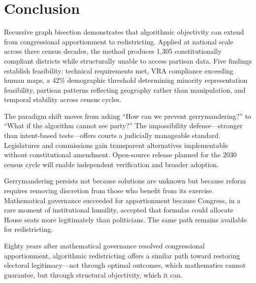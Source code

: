 \section{Conclusion}

Recursive graph bisection demonstrates that algorithmic objectivity can extend from congressional apportionment to redistricting. Applied at national scale across three census decades, the method produces 1,305 constitutionally compliant districts while structurally unable to access partisan data. Five findings establish feasibility: technical requirements met, VRA compliance exceeding human maps, a 42\% demographic threshold determining minority representation feasibility, partisan patterns reflecting geography rather than manipulation, and temporal stability across census cycles.

The paradigm shift moves from asking ``How can we prevent gerrymandering?'' to ``What if the algorithm cannot see party?'' The impossibility defense---stronger than intent-based tests---offers courts a judicially manageable standard. Legislatures and commissions gain transparent alternatives implementable without constitutional amendment. Open-source release planned for the 2030 census cycle will enable independent verification and broader adoption.

Gerrymandering persists not because solutions are unknown but because reform requires removing discretion from those who benefit from its exercise. Mathematical governance succeeded for apportionment because Congress, in a rare moment of institutional humility, accepted that formulas could allocate House seats more legitimately than politicians. The same path remains available for redistricting.

Eighty years after mathematical governance resolved congressional apportionment, algorithmic redistricting offers a similar path toward restoring electoral legitimacy---not through optimal outcomes, which mathematics cannot guarantee, but through structural objectivity, which it can.
